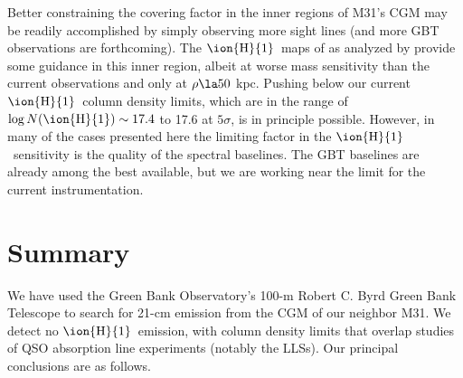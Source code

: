 \documentclass[12pt,preprint]{aastex6}
\newcommand{\HI}{\ensuremath{\mbox{\ion{H}{1}}}}
\newcommand{\logNHI}{\ensuremath{\log N(\mbox{\ion{H}{1}})}\relax}
\newcommand{\msun}{\ensuremath{M_\odot}\relax}
\newcommand{\bull}{$\bullet \ $}
\begin{document}
Better constraining the covering factor in the inner regions of M31's
CGM may be readily accomplished by simply observing more sight lines
(and more GBT observations are forthcoming). The \HI\ maps of
\citet{thilker2004} as analyzed by \citet{richter2012} provide some
guidance in this inner region, albeit at worse mass sensitivity than
the current observations and only at $\rho \la 50$ kpc. Pushing below
our current \HI\ column density limits, which are in the range of
$\logNHI \sim 17.4$ to 17.6 at $5\sigma$, is in principle
possible. However, in many of the cases presented here the limiting
factor in the \HI\ sensitivity is the quality of the spectral
baselines. The GBT baselines are already among the best available, but
we are working near the limit for the current instrumentation.







\section{Summary}
\label{sec:summary}

We have used the Green Bank Observatory's 100-m Robert C. Byrd Green
Bank Telescope to search for 21-cm emission from the CGM of our
neighbor M31. We detect no \HI\ emission, with column density limits
that overlap studies of QSO absorption line experiments (notably the
LLSs). Our principal conclusions are as follows.
\end{document}
